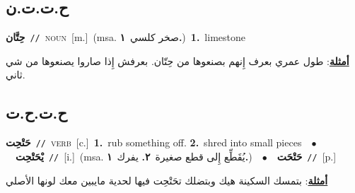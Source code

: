 \documentclass[10pt,a4paper,twoside]{article} %
\begin{document}
\begin{multicols}{2}
{{{{{{{{\vspace{-3mm}
\subsection*{\color{blue}\foreignlanguage{arabic}{ح.ت.ت.ن}\color{blue}{ (ntws)}} 

{\setlength\topsep{0pt}\textbf{\foreignlanguage{arabic}{حِتَّان}}\ {\color{gray}\texttt{//}\color{black}}\ \textsc{noun}\ [m.]\ \color{gray}(msa. \foreignlanguage{arabic}{صخر كلسي}~\foreignlanguage{arabic}{\textbf{١.}})\color{black}\ \textbf{1.}~limestone\  \begin{flushright}\color{gray}\foreignlanguage{arabic}{\textbf{\underline{\foreignlanguage{arabic}{أمثلة}}}: طول عمري بعرف إِنهم بصنعوها من حِتّان. بعرفش إِذا صاروا يصنعوها من شي ثاني.}\end{flushright}\color{black}} \vspace{2mm}

\vspace{-3mm}
\subsection*{\color{blue}\foreignlanguage{arabic}{ح.ت.ح.ت}\color{blue}{}} 

{\setlength\topsep{0pt}\textbf{\foreignlanguage{arabic}{حَتْحِت}}\ {\color{gray}\texttt{//}\color{black}}\ \textsc{verb}\ [c.]\ \textbf{1.}~rub something off.  \textbf{2.}~shred into small pieces\ \ $\bullet$\ \ \setlength\topsep{0pt}\textbf{\foreignlanguage{arabic}{يْحَتْحِت}}\ {\color{gray}\texttt{//}\color{black}}\ [i.]\ \color{gray}(msa. \foreignlanguage{arabic}{يُقَطِّع إِلى قطع صغيرة}~\foreignlanguage{arabic}{\textbf{٢.}}  \foreignlanguage{arabic}{يفرك}~\foreignlanguage{arabic}{\textbf{١.}})\color{black}\ \ $\bullet$\ \ \setlength\topsep{0pt}\textbf{\foreignlanguage{arabic}{حَتْحَت}}\ {\color{gray}\texttt{//}\color{black}}\ [p.]\  \begin{flushright}\color{gray}\foreignlanguage{arabic}{\textbf{\underline{\foreignlanguage{arabic}{أمثلة}}}: بتمسك السكينة هيك وبتضلك تحَتْحِت فيها لحدية مايبين معك لونها الأصلي}\end{flushright}\color{black}} \vspace{2mm}

}}}}}}}}
\end{multicols}
\end{document}
